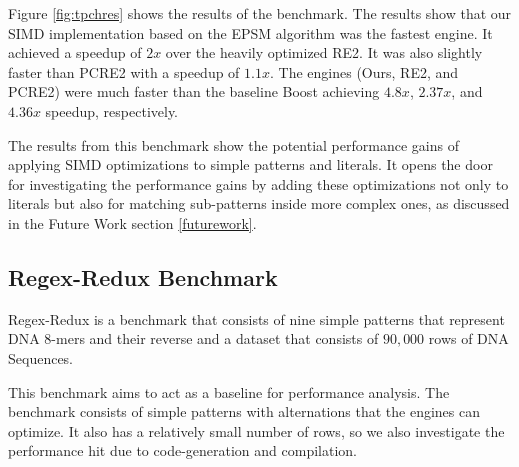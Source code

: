 Figure \ref{fig:tpchres} shows the results of the benchmark. The results show that our SIMD implementation based on the EPSM algorithm was the fastest engine. It achieved a speedup of $2x$ over the heavily optimized RE2. It was also slightly faster than PCRE2 with a speedup of $1.1x$. The engines (Ours, RE2, and PCRE2) were much faster than the baseline Boost achieving $4.8x$, $2.37x$, and $4.36x$ speedup, respectively.

The results from this benchmark show the potential performance gains of applying SIMD optimizations to simple patterns and literals. It opens the door for investigating the performance gains by adding these optimizations not only to literals but also for matching sub-patterns inside more complex ones, as discussed in the Future Work section \ref{futurework}.

\subsection{Regex-Redux Benchmark}\label{regexredux}
Regex-Redux \cite{regexredux} is a benchmark that consists of nine simple patterns that represent DNA 8-mers and their reverse and a dataset that consists of $90,000$ rows of DNA Sequences.

This benchmark aims to act as a baseline for performance analysis. The benchmark consists of simple patterns with alternations that the engines can optimize. It also has a relatively small number of rows, so we also investigate the performance hit due to code-generation and compilation.

